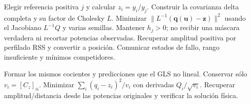 \documentclass[11pt,a4paper]{article}
\begin{document}
\begin{algorithm}[htbp]\caption{GLS no lineal de cocientes}\begin{algorithmic}[1]
\State Elegir referencia positiva $j$ y calcular $z_i=y_i/y_j$.
\State Construir la covarianza delta completa y su factor de Cholesky $L$.
\State Minimizar $\|L^{-1}(\mathbf q(\mathbf u)-\mathbf z)\|^2$ usando el Jacobiano $L^{-1}Q$ y varias semillas.
\State Mantener $h_j>0$; no recibir una máscara verdadera ni recortar potencias observadas.
\State Recuperar amplitud positiva por perfilado RSS y convertir a posición.
\State Comunicar estados de fallo, rango insuficiente y mínimos competidores.
\end{algorithmic}\end{algorithm}
\begin{algorithm}[htbp]\caption{WLS no lineal de cocientes}\begin{algorithmic}[1]
\State Formar los mismos cocientes y predicciones que el GLS no lineal.
\State Conservar sólo $v_i=[C_z]_{ii}$.
\State Minimizar $\sum_i(q_i-z_i)^2/v_i$ con derivadas $Q_i/\sqrt{v_i}$.
\State Recuperar amplitud/distancia desde las potencias originales y verificar la solución física.
\end{algorithmic}\end{algorithm}
\end{document}
